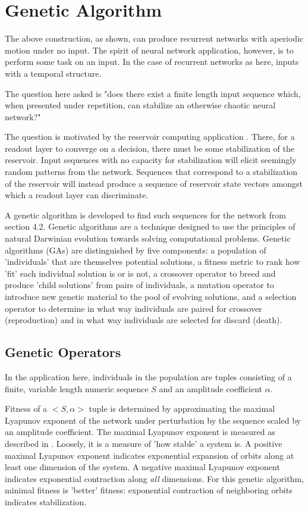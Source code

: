 \documentclass[12pt]{article}
\begin{document}
\section{Genetic Algorithm}
The above construction, as shown, can produce recurrent networks with
aperiodic motion under no input.  The spirit of neural network application,
however, is to perform some task on an input.  In the case of recurrent
networks as here, inputs with a temporal structure.

The question here asked is "does there exist a finite length input sequence
which, when presented under repetition, can stabilize an otherwise chaotic
neural network?"

The question is motivated by the reservoir computing application
\cite{jaeger_original, maass_original}.  There, for a readout
layer to converge on a decision, there must be some stabilization of the
reservoir.  Input sequences with no capacity for stabilization will
elicit seemingly random patterns from the network.  Sequences that
correspond to a stabilization of the reservoir will instead produce a sequence
of reservoir state vectors amongst which a readout layer can discriminate.

A genetic algorithm is developed to find such sequences for the network from
section 4.2.  Genetic algorithms are a technique designed to use
the principles of natural Darwinian evolution towards solving computational
problems.  Genetic algorithms (GAs) are distinguished by five components:  a
population of 'individuals' that are themselves potential solutions, a fitness
metric to rank how 'fit' each individual solution is or is not, a crossover
operator to breed and produce 'child solutions' from pairs of individuals,
a mutation operator to introduce new genetic material to the pool of
evolving solutions, and a selection operator to determine in what way
individuals are paired for crossover (reproduction) and in what way 
individuals are selected for discard (death).

\subsection{Genetic Operators}
In the application here, individuals in the population are
tuples consisting of a finite, variable length numeric sequence $S$ and an
amplitude coefficient $\alpha$.

Fitness of a $<S, \alpha>$ tuple is determined by
approximating the maximal Lyapunov exponent of the network
under perturbation by the sequence scaled
by an amplitude coefficient.  The maximal Lyapunov exponent is
measured as described in \cite{sprott}.  Loosely, it is a measure of 'how
stable' a system is.  A positive maximal Lyapunov exponent indicates exponential
expansion of orbits along at least one dimension of the system.  A negative
maximal Lyapunov exponent indicates exponential contraction along \textit{all}
dimensions.  For this genetic algorithm, minimal fitness
is 'better' fitness: exponential contraction of neighboring orbits indicates
stabilization.
\end{document}

